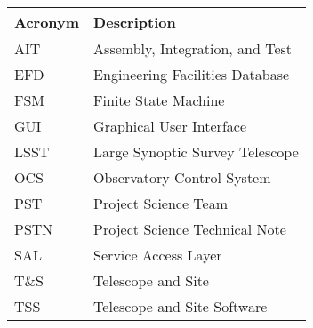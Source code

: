 \addtocounter{table}{-1}
\begin{longtable}{|l|p{}|}\hline
\textbf{Acronym} & \textbf{Description}  \\\hline

AIT & Assembly, Integration, and Test \\\hline
EFD & Engineering Facilities Database \\\hline
FSM & Finite State Machine \\\hline
GUI & Graphical User Interface \\\hline
LSST & Large Synoptic Survey Telescope \\\hline
OCS & Observatory Control System \\\hline
PST & Project Science Team \\\hline
PSTN & Project Science Technical Note \\\hline
SAL & Service Access Layer \\\hline
T\&S & Telescope and Site \\\hline
TSS & Telescope and Site Software \\\hline
\end{longtable}
